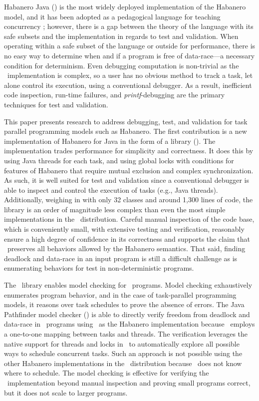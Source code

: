 Habanero Java (\hj) is the most widely deployed implementation of the
Habanero model, and it has been adopted as a pedagogical language for
teaching concurrency \cite{Cave:2011:HNA:2093157.2093165}; however,
there is a gap between the theory of the language with its safe subsets
and the implementation in regards to test and validation.  When operating
within a safe subset of the language or outside for
performance, there is no easy way to determine when and if a program
is free of data-race---a necessary condition for determinism. Even
debugging computation is non-trivial as the \hj\ implementation is
complex, so a user has no obvious method to track a task, let alone
control its execution, using a conventional debugger. As a result,
inefficient code inspection, run-time failures, and
\emph{printf}-debugging are the primary techniques for test and validation.

This paper presents research to address debugging, test, and
validation for task parallel programming models such as Habanero. The
first contribution is a new implementation of Habanero for Java in the
form of a library (\hjv). The implementation trades performance for
simplicity and correctness. It does this by using Java threads for
each task, and using global locks with conditions for features of
Habanero that require mutual exclusion and complex synchronization. As
such, it is well suited for test and validation since a conventional
debugger is able to inspect and control the execution of tasks (e.g.,
Java threads). Additionally, weighing in with only 32
classes and around 1,300 lines of code, the library is an
order of magnitude less complex than even the most simple
implementations in the \hj\ distribution. Careful manual inspection of
the code base, which is conveniently small, with extensive testing and
verification, reasonably ensure a high degree of confidence in its correctness and supports the
claim that \hjv\ preserves all behaviors allowed by the Habanero
semantics. That said, finding deadlock and data-race in an input
program is still a difficult challenge as is enumerating behaviors for test in non-deterministic programs.

The \hjv\ library enables model checking for \hj\ programs. Model
checking exhaustively enumerates program behavior, and in the case of
task-parallel programming models, it reasons over task schedules to
prove the absence of errors. The Java Pathfinder model checker (\jpf)
is able to directly verify freedom from deadlock and data-race in
\hj\ programs using \hjv\ as the Habanero implementation because \hjv\ employs a one-to-one
mapping between tasks and threads. The verification leverages the
native support for threads and locks in \jpf\ to automatically explore all possible
ways to schedule concurrent tasks. Such an approach is not possible
using the other Habanero implementations in the \hj\ distribution
because \jpf\ does not know where to schedule. The model checking is effective for verifying the
\hjv\ implementation beyond manual inspection and proving small
programs correct, but it does not scale to larger programs.

